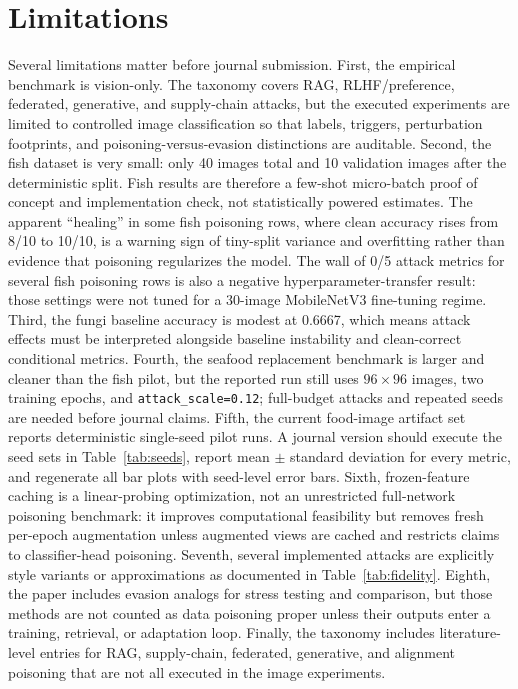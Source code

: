 \documentclass[conference]{IEEEtran}
\begin{document}
\section{Limitations}

Several limitations matter before journal submission. First, the empirical benchmark is vision-only. The taxonomy covers RAG, RLHF/preference, federated, generative, and supply-chain attacks, but the executed experiments are limited to controlled image classification so that labels, triggers, perturbation footprints, and poisoning-versus-evasion distinctions are auditable. Second, the fish dataset is very small: only 40 images total and 10 validation images after the deterministic split. Fish results are therefore a few-shot micro-batch proof of concept and implementation check, not statistically powered estimates. The apparent ``healing'' in some fish poisoning rows, where clean accuracy rises from 8/10 to 10/10, is a warning sign of tiny-split variance and overfitting rather than evidence that poisoning regularizes the model. The wall of 0/5 attack metrics for several fish poisoning rows is also a negative hyperparameter-transfer result: those settings were not tuned for a 30-image MobileNetV3 fine-tuning regime. Third, the fungi baseline accuracy is modest at 0.6667, which means attack effects must be interpreted alongside baseline instability and clean-correct conditional metrics. Fourth, the seafood replacement benchmark is larger and cleaner than the fish pilot, but the reported run still uses \(96\times96\) images, two training epochs, and \texttt{attack\_scale=0.12}; full-budget attacks and repeated seeds are needed before journal claims. Fifth, the current food-image artifact set reports deterministic single-seed pilot runs. A journal version should execute the seed sets in Table~\ref{tab:seeds}, report mean \(\pm\) standard deviation for every metric, and regenerate all bar plots with seed-level error bars. Sixth, frozen-feature caching is a linear-probing optimization, not an unrestricted full-network poisoning benchmark: it improves computational feasibility but removes fresh per-epoch augmentation unless augmented views are cached and restricts claims to classifier-head poisoning. Seventh, several implemented attacks are explicitly style variants or approximations as documented in Table~\ref{tab:fidelity}. Eighth, the paper includes evasion analogs for stress testing and comparison, but those methods are not counted as data poisoning proper unless their outputs enter a training, retrieval, or adaptation loop. Finally, the taxonomy includes literature-level entries for RAG, supply-chain, federated, generative, and alignment poisoning that are not all executed in the image experiments.
\end{document}
